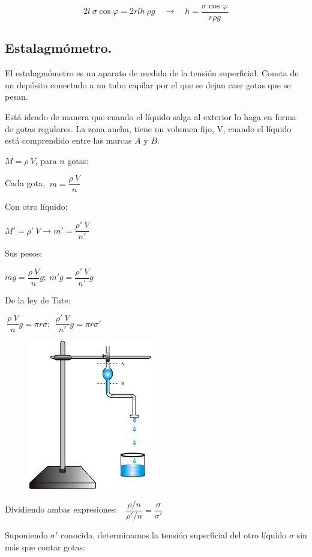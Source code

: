 \vspace{-4mm} %
$$2l\ \sigma \cos \varphi=2rlh\ \rho g \quad \to \quad h=\dfrac{\sigma \cos \varphi}{r\rho g}$$ 

\subsection{Estalagmómetro.}
El estalagmómetro es un aparato de medida de la tensión superficial. Consta de un depósito conectado a un tubo capilar por el que se dejan caer gotas que se pesan. 

 Está ideado de manera que cuando el líquido salga al exterior lo haga en forma de gotas regulares. La zona ancha, tiene un volumen fijo, V, cuando el líquido está comprendido entre las marcas $A$ y $B$.

 
\begin{multicols}{2}
$M=\rho \ V$, para $n$ gotas:

Cada gota, $\ m=\dfrac {\rho\ V}{n}$

Con otro líquido:

$M'=\rho'\ V \to m'=\dfrac {\rho'\ V}{n'}$

Sus pesos:

$mg=\dfrac {\rho\ V}{n}g; \ m'g=\dfrac {\rho'\ V}{n'}g$

De la ley de Tate: 

$\ \dfrac {\rho\ V}{n} g=\pi r \sigma; \ \ \dfrac {\rho'\ V}{n'} g=\pi r \sigma'$ 

\begin{figure}[H]
	\centering
	\includegraphics[width=.4\textwidth]{imagenes/imagenes08/T08IM16.png}
\end{figure}	
\end{multicols}
Dividiendo ambas expresiones:$\quad \dfrac{\rho/n}{\rho'/n}=\dfrac \sigma {\sigma'}$

Suponiendo $\sigma'$ conocida, determinamos la tensión superficial del otro líquido $\sigma$ sin más que contar gotas:

